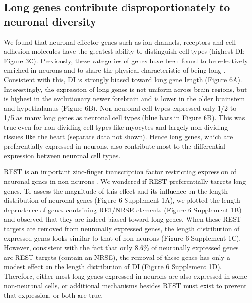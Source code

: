 \subsection{Long genes contribute disproportionately to neuronal diversity}

We found that neuronal effector genes such as ion channels, receptors and cell adhesion molecules have the greatest ability to distinguish cell types (highest DI; Figure 3C). Previously, these categories of genes have been found to be selectively enriched in neurons and to share the physical characteristic of being long \citep{Sugino_2014,Gabel_2015,Zylka_2015}. Consistent with this, DI is strongly biased toward long gene length (Figure 6A). Interestingly, the expression of long genes is not uniform across brain regions, but is highest in the evolutionary newer forebrain and is lower in the older brainstem and hypothalamus (Figure 6B). Non-neuronal cell types expressed only 1/2 to 1/5 as many long genes as neuronal cell types (blue bars in Figure 6B). This was true even for non-dividing cell types like myocytes and largely non-dividing tissues like the heart (separate data not shown). Hence long genes, which are preferentially expressed in neurons, also contribute most to the differential expression between neuronal cell types. 

REST is an important zinc-finger transcription factor restricting expression of neuronal genes in non-neurons \citep{RN1,RN2a}. We wondered if REST preferentially targets long genes. To assess the magnitude of this effect and its influence on the length distribution of neuronal genes (Figure 6 Supplement 1A), we plotted the length-dependence of genes containing RE1/NRSE elements (Figure 6 Supplement 1B) and observed that they are indeed biased toward long genes. When these REST targets are removed from neuronally expressed genes, the length distribution of expressed genes looks similar to that of non-neurons (Figure 6 Supplement 1C). However, consistent with the fact that only 8.6\% of neuronally expressed genes are REST targets (contain an NRSE), the removal of these genes has only a modest effect on the length distribution of DI (Figure 6 Supplement 1D). Therefore, either most long genes expressed in neurons are also expressed in some non-neuronal cells, or additional mechanisms besides REST must exist to prevent that expression, or both are true. 

